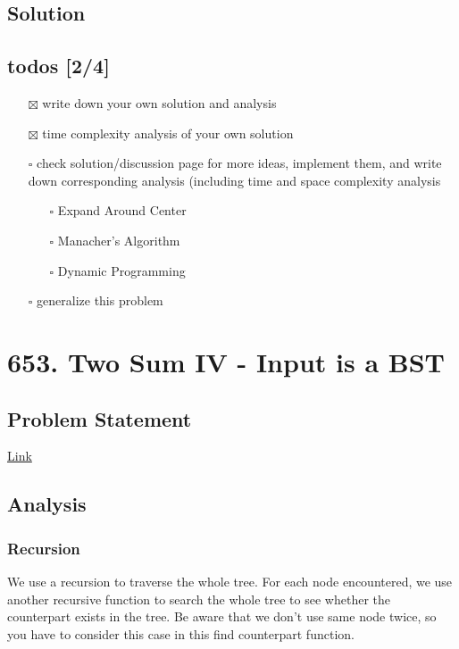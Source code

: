 \documentclass[11pt]{article}
\begin{document}
\subsection{Solution}
\label{sec:org489ce7c}

\subsection{todos [2/4]}
\label{sec:orgf80db36}
\begin{itemize}
\item[{$\boxtimes$}] write down your own solution and analysis
\item[{$\boxtimes$}] time complexity analysis of your own solution
\item[{$\square$}] check solution/discussion page for more ideas, implement them, and write down corresponding analysis (including time and space complexity analysis
\begin{itemize}
\item[{$\square$}] Expand Around Center
\item[{$\square$}] Manacher's Algorithm
\item[{$\square$}] Dynamic Programming
\end{itemize}
\item[{$\square$}] generalize this problem
\end{itemize}
\section{653. Two Sum IV - Input is a BST}
\label{sec:orgafcb05b}
\subsection{Problem Statement}
\label{sec:org8422cda}
\href{https://leetcode.com/problems/two-sum-iv-input-is-a-bst/}{Link}
\subsection{Analysis}
\label{sec:org2664d8b}
\subsubsection{Recursion}
\label{sec:org66a2d58}
We use a recursion to traverse the whole tree. For each node encountered, we use another recursive function to search the whole tree to see whether the counterpart exists in the tree. Be aware that we don't use same node twice, so you have to consider this case in this find counterpart function.
\end{document}
